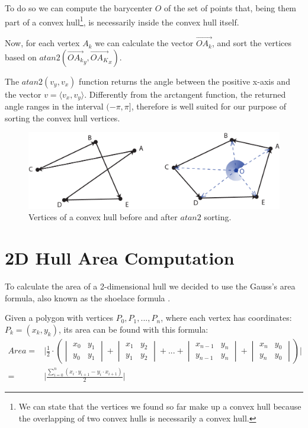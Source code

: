 \documentclass{PoliMi_MasterThesis}
\begin{document}
To do so we can compute the barycenter $O$ of the set of points that, being them part of a convex hull\footnote{We can state that the vertices we found so far make up a convex hull because the overlapping of two convex hulls is necessarily a convex hull.}, is necessarily inside the convex hull itself.

Now, for each vertex $A_k$ we can calculate the vector $\overrightarrow{OA_k}$, and sort the vertices based on $atan2(\overrightarrow{OA_k}_y, \overrightarrow{OA_K}_x)$.

The $atan2(v_y, v_x)$ function returns the angle between the positive x-axis and the vector $v=\langle v_x, v_y \rangle$. Differently from the arctangent function, the returned angle ranges in the interval $(-\pi, \pi]$, therefore is well suited for our purpose of sorting the convex hull vertices.

\begin{figure}[H]
    \centering
    \includegraphics[width=\textwidth*\real{0.75}]{Images/vertices_sorting.png} 
    \caption{Vertices of a convex hull before and after $atan2$ sorting.}
    \label{fig:vertices_sorting}
\end{figure}

\section{2D Hull Area Computation} \label{sec:2dHull_area_computation}
To calculate the area of a 2-dimensional hull we decided to use the Gauss's area formula, also known as the shoelace formula \cite{shoelace_formula}.

Given a polygon with vertices $P_0, P_1, ..., P_n$, where each vertex has coordinates: $P_k = (x_k, y_k)$, its area can be found with this formula:
\begin{align*}
	Area =& \bigg|\frac{1}{2}\cdot\left(\begin{vmatrix} x_0 & y_1\\y_0 & y_1 \end{vmatrix} + \begin{vmatrix} x_1 & y_2\\y_1 & y_2 \end{vmatrix} + ... + \begin{vmatrix} x_{n-1} & y_n\\y_{n-1} & y_n \end{vmatrix} + \begin{vmatrix} x_n & y_0\\y_n & y_0 \end{vmatrix}\right)\bigg|\\
	=& \Bigg|\frac{\displaystyle\sum_{i=0}^{n}(x_i \cdot y_{i+1} - y_i \cdot x_{i+1})}{2}\Bigg|
\end{align*}
\end{document}
